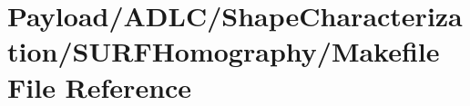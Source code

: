 \hypertarget{Payload_2ADLC_2ShapeCharacterization_2SURFHomography_2Makefile}{\section{Payload/\-A\-D\-L\-C/\-Shape\-Characterization/\-S\-U\-R\-F\-Homography/\-Makefile File Reference}
\label{Payload_2ADLC_2ShapeCharacterization_2SURFHomography_2Makefile}
}
